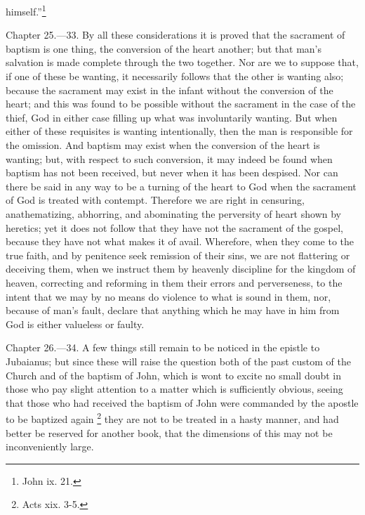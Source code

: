 himself.''\footnote{\par  John ix. 21.}


Chapter 25.—33. By all these considerations it is proved that the sacrament of baptism is one thing, the conversion of the heart another; but that man’s salvation is made complete through the two together. Nor are we to suppose that, if one of these be wanting, it necessarily follows that the other is wanting also; because the sacrament may exist in the infant without the conversion of the heart; and this was found to be possible without the sacrament in the case of the thief, God in either case filling up what was involuntarily wanting. But when either of these requisites is wanting intentionally, then the man is responsible for the omission. And baptism may exist when the conversion of the heart is wanting; but, with respect to such conversion, it may indeed be found when baptism has not been received, but never when it has been despised. Nor can there be said in any way to be a turning of the heart to God when the sacrament of God is treated with contempt. Therefore we are right in censuring, anathematizing, abhorring, and abominating the perversity of heart shown by heretics; yet it does not follow that they have not the sacrament of the gospel, because they have not what makes it of avail. Wherefore, when they come to the true faith, and by penitence seek remission of their sins, we are not flattering or deceiving them, when we instruct them by heavenly discipline for the kingdom of heaven, correcting and reforming in them their errors and perverseness, to the intent that we may by no means do violence to what is sound in them, nor, because of man’s fault, declare that anything which he may have in him from God is either valueless or faulty.


Chapter 26.—34. A few things still remain to be noticed in the epistle to Jubaianus; but since these will raise the question both of the past custom of the Church and of the baptism of John, which is wont to excite no small doubt in those who pay slight attention to a matter which is sufficiently obvious, seeing that those who had received the baptism of John were commanded by the apostle to be baptized again \footnote{\par  Acts xix. 3-5.} they are not to be treated in a hasty manner, and had better be reserved for another book, that the dimensions of this may not be inconveniently large.


